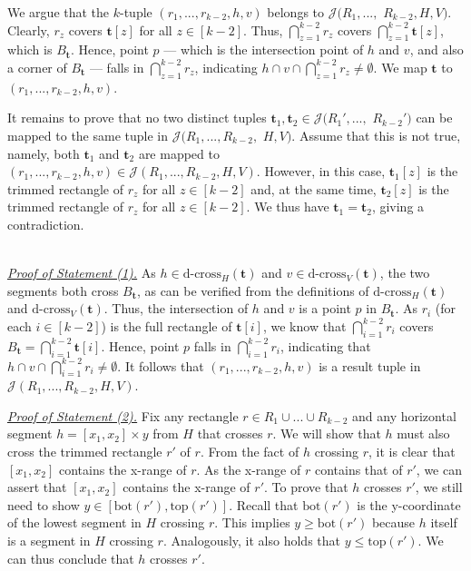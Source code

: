 \documentclass[sigconf]{acmart}
\def\vgap{\vspace{0mm}}
\def\extraspacing{\vspace{1.5mm} \noindent}
\def\J{\mathcal{J}}
\def\ybot{\mathrm{bot}}
\def\ytop{\mathrm{top}}
\def\dcross{\mathrm{d\text{-}cross}}
\begin{document}
{{{\vgap

We argue that the $k$-tuple $(r_1, ..., r_{k-2}, h, v)$ belongs to $\J(R_1,...,$ $R_{k-2},H,V)$. Clearly, $r_z$ covers $\bm{t}[z]$ for all $z \in [k-2]$. Thus, $\bigcap_{z=1}^{k-2} r_z$ covers $\bigcap_{z=1}^{k-2} \bm{t}[z]$, which is $B_\bm{t}$. Hence, point $p$ --- which is the intersection point of $h$ and $v$, and also a corner of $B_\bm{t}$ --- falls in $\bigcap_{z=1}^{k-2} r_z$, indicating $h \cap v \cap \bigcap_{z=1}^{k-2} r_z \ne \emptyset$. We map $\bm{t}$ to $(r_1, ..., r_{k-2}, h, v)$.

\vgap

It remains to prove that no two distinct tuples $\bm{t}_1, \bm{t}_2 \in \J(R_1',...,$ $R_{k-2}')$ can be mapped to the same tuple in $\J(R_1,..., R_{k-2},$ $H, V)$. Assume that this is not true, namely, both $\bm{t}_1$ and $\bm{t}_2$ are mapped to $(r_1, ..., r_{k-2}, h, v) \in \J(R_1,..., R_{k-2}, H, V)$. However, in this case, $\bm{t}_1[z]$ is the trimmed rectangle of $r_z$ for all $z \in [k-2]$ and, at the same time, $\bm{t}_2[z]$ is the trimmed rectangle of $r_z$ for all $z \in [k-2]$. We thus have $\bm{t}_1 = \bm{t}_2$, giving a contradiction.

\extraspacing {\bf Proof of Lemma~\ref{lmm:hv:type1:properties}.} \\
\underline{\em Proof of Statement (1).} As $h \in \dcross_H(\bm{t})$ and $v \in \dcross_V(\bm{t})$, the two segments both cross $B_\bm{t}$, as can be verified from the definitions of $\dcross_H(\bm{t})$ and $\dcross_V(\bm{t})$. Thus, the intersection of $h$ and $v$ is a point $p$ in $B_\bm{t}$. As $r_i$ (for each $i \in [k-2]$) is the full rectangle of $\bm{t}[i]$, we know that $\bigcap_{i=1}^{k-2} r_i$ covers $B_\bm{t} = \bigcap_{i=1}^{k-2} \bm{t}[i]$. Hence, point $p$ falls in $\bigcap_{i=1}^{k-2} r_i$, indicating that $h\cap v \cap \bigcap_{i = 1}^{k-2}r_i \neq \emptyset$. It follows that $(r_1,...,r_{k-2},h,v)$ is a result tuple in $\J(R_1,...,R_{k-2},H,V)$.

\vgap

\noindent \underline{\em Proof of Statement (2).} Fix any rectangle $r \in R_1 \cup ... \cup R_{k-2}$ and any horizontal segment $h = [x_1, x_2] \times y$ from $H$ that crosses $r$. We will show that $h$ must also cross the trimmed rectangle $r'$ of $r$. From the fact of $h$ crossing $r$, it is clear that $[x_1, x_2]$ contains the x-range of $r$. As the x-range of $r$ contains that of $r'$, we can assert that $[x_1, x_2]$ contains the x-range of $r'$. To prove that $h$ crosses $r'$, we still need to show $y \in [\ybot(r'), \ytop(r')]$. Recall that $\ybot(r')$ is the y-coordinate of the lowest segment in $H$ crossing $r$. This implies $y \ge \ybot(r')$ because $h$ itself is a segment in $H$ crossing $r$. Analogously, it also holds that $y \le \ytop(r')$. We can thus conclude that $h$ crosses $r'$. 

}}}
\end{document}
